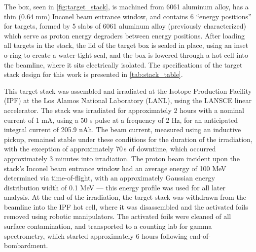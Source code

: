 \documentclass[3p]{elsarticle}
\begin{document}
The box, seen in \autoref{fig:target_stack}, is machined from 6061 aluminum alloy, has a thin (0.64 mm) Inconel beam entrance window, and  contains 6 \enquote{energy positions} for targets, formed by  5 slabs of 6061 aluminum alloy (previously characterized) which serve as proton energy degraders  between energy positions.
After loading all targets in the stack, the lid of the target box is sealed in place, using an inset o-ring to create a water-tight seal, and the box is lowered through a hot cell into the beamline, where it sits electrically isolated.
The specifications of the target stack design for this work is presented in \autoref{tab:stack_table}.



This target stack was assembled and irradiated at the Isotope Production Facility (IPF) at the Los Alamos National Laboratory (LANL), using the LANSCE linear accelerator. 
The stack was irradiated for approximately 2 hours with a nominal current of 1 mA, using a 50 \micro s pulse at a frequency of 2 Hz, for an anticipated integral current of 205.9 nAh.
The beam current, measured using an inductive pickup, remained stable under these conditions for the duration of the irradiation, with the exception of approximately 70\,s of downtime, which occurred approximately 3 minutes into irradiation.
The proton beam incident upon the stack's Inconel beam entrance window had an average energy of 100 MeV determined via time-of-flight, with an approximately Gaussian energy distribution width of 0.1 MeV --- this energy profile was used for all later analysis.
At the end of the irradiation, the target stack was withdrawn from the beamline into the IPF hot cell, where it was disassembled and the activated foils removed using robotic manipulators.
The activated foils were cleaned of all surface contamination, and transported to a counting lab for gamma spectrometry, which started approximately 6 hours following end-of-bombardment.
\end{document}
